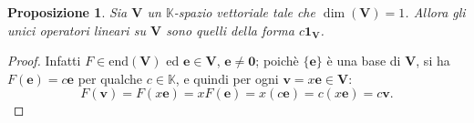 \documentclass{article}
\theoremstyle{plain}
\newtheorem{prop}[thm]{Proposizione}
\theoremstyle{definition}
\theoremstyle{remark}
\begin{document}
\begin{bxthm}
\begin{prop}
    Sia $\mathbf{V}$ un $\mathbb{K}$-spazio vettoriale tale che $\dim(\mathbf{V})=1$. 
    Allora gli unici operatori lineari su $\mathbf{V}$ sono quelli della forma $c\mathbf{1}_\mathbf{V}$.
\end{prop}
\end{bxthm}
\begin{proof}
    Infatti $F\in\mathrm{end}(\mathbf{V})$ ed $\mathbf{e}\in\mathbf{V}$, $\mathbf{e}\neq\mathbf{0}$; poichè $\{\mathbf{e}\}$ è 
    una base di $\mathbf{V}$, si ha $F(\mathbf{e})=c\mathbf{e}$ per qualche $c\in\mathbb{K}$, e quindi per ogni $\mathbf{v}=x\mathbf{e}\in\mathbf{V}$:
    \[F(\mathbf{v})=F(x\mathbf{e})=xF(\mathbf{e})=x(c\mathbf{e})=c(x\mathbf{e})=c\mathbf{v}.\]    
\end{proof}

\vspace{10pt}
\end{document}
